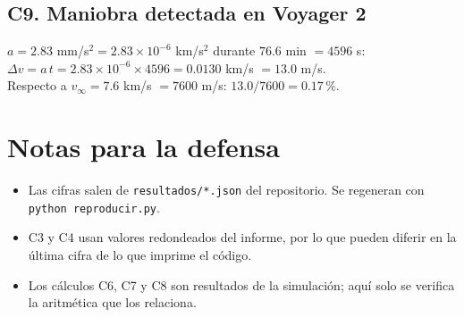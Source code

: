 \documentclass[11pt,letterpaper]{article}
\newcommand{\vinf}{v_\infty}\newcommand{\RJ}{R_J}
\begin{document}
\subsection*{C9. Maniobra detectada en Voyager 2}
$a=2.83$ mm/s$^2=2.83\times10^{-6}$ km/s$^2$ durante $76.6$ min $=4596$ s:\\
$\Delta v=a\,t=2.83\times10^{-6}\times4596=0.0130$ km/s $=\mathbf{13.0}$ m/s.\\
Respecto a $\vinf=7.6$ km/s $=7600$ m/s: $13.0/7600=0.17\,\%$.

\section*{Notas para la defensa}
\begin{itemize}
\item Las cifras salen de \texttt{resultados/*.json} del repositorio. Se regeneran con \texttt{python reproducir.py}.
\item C3 y C4 usan valores redondeados del informe, por lo que pueden diferir en la última cifra de lo que imprime el código.
\item Los cálculos C6, C7 y C8 son resultados de la simulación; aquí solo se verifica la aritmética que los relaciona.
\end{itemize}
\end{document}
